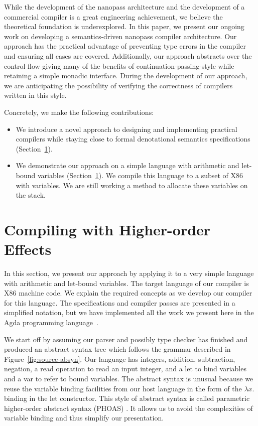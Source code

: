 \documentclass[a4paper,UKenglish,cleveref, autoref, thm-restate, anonymous]{oasics-v2021}
\begin{document}
While the development of the nanopass architecture and the development of a commercial compiler is a great engineering achievement, we believe the theoretical foundation is underexplored.
In this paper, we present our ongoing work on developing a semantics-driven nanopass compiler architecture.
Our approach has the practical advantage of preventing type errors in the compiler and ensuring all cases are covered.
Additionally, our approach abstracts over the control flow giving many of the benefits of continuation-passing-style while retaining a simple monadic interface.
During the development of our approach, we are anticipating the possibility of verifying the correctness of compilers written in this style.

\noindent
Concretely, we make the following contributions:
\begin{itemize}
  \item We introduce a novel approach to designing and implementing practical compilers while staying close to formal denotational semantics specifications (Section~\ref{sec:compiling}). 
  \item We demonstrate our approach on a simple language with arithmetic and let-bound variables (Section~\ref{sec:compiling}). We compile this language to a subset of X86 with variables. We are still working a method to allocate these variables on the stack.
\end{itemize}

\section{Compiling with Higher-order Effects}\label{sec:compiling}

In this section, we present our approach by applying it to a very simple language with arithmetic and let-bound variables.
The target language of our compiler is X86 machine code.
We explain the required concepts as we develop our compiler for this language.
The specifications and compiler passes are presented in a simplified notation, but we have implemented all the work we present here in the Agda programming language~\cite{10.1007/978-3-642-03359-9_6}.

We start off by assuming our parser and possibly type checker has finished and produced an abstract syntax tree which follows the grammar described in Figure~\ref{fig:source-absyn}.
Our language has integers, addition, subtraction, negation, a read operation to read an input integer, and a let to bind variables and a var to refer to bound variables.
The abstract syntax is unusual because we reuse the variable binding facilities from our host language in the form of the $\lambda x.$ binding in the let constructor.
This style of abstract syntax is called parametric higher-order abstract syntax (PHOAS) \cite{10.1145/1411203.1411226}.
It allows us to avoid the complexities of variable binding and thus simplify our presentation.
\end{document}

